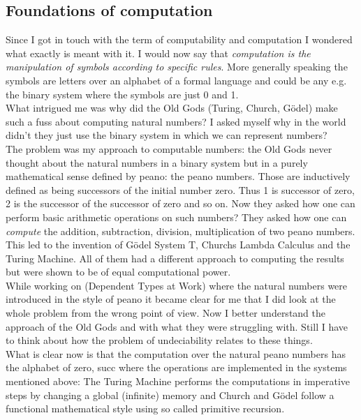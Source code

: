 \subsection*{Foundations of computation}
Since I got in touch with the term of computability and computation I wondered what exactly is meant with it. I would now say that \textit{computation is the manipulation of symbols according to specific rules}. More generally speaking the symbols are letters over an alphabet of a formal language and could be any e.g. the binary system where the symbols are just 0 and 1. \\
What intrigued me was why did the Old Gods (Turing, Church, Gödel) make such a fuss about computing natural numbers? I asked myself why in the world didn't they just use the binary system in which we can represent numbers? \\ The problem was my approach to computable numbers: the Old Gods never thought about the natural numbers in a binary system but in a purely mathematical sense defined by peano: the peano numbers. Those are inductively defined as being successors of the initial number zero. Thus 1 is successor of zero, 2 is the successor of the successor of zero and so on. Now they asked how one can perform basic arithmetic operations on such numbers? They asked how one can \textit{compute} the addition, subtraction, division, multiplication of two peano numbers. This led to the invention of Gödel System T, Churchs Lambda Calculus and the Turing Machine. All of them had a different approach to computing the results but were shown to be of equal computational power. \\ 
While working on \cite{Bove2009} (Dependent Types at Work) where the natural numbers were introduced in the style of peano it became clear for me that I did look at the whole problem from the wrong point of view. Now I better understand the approach of the Old Gods and with what they were struggling with. Still I have to think about how the problem of undeciability relates to these things. \\
What is clear now is that the computation over the natural peano numbers has the alphabet of {zero, succ} where the operations are implemented in the systems mentioned above: The Turing Machine performs the computations in imperative steps by changing a global (infinite) memory and Church and Gödel follow a functional mathematical style using so called primitive recursion.

